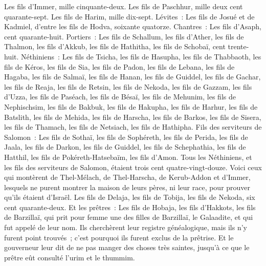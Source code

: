 \begin{multicols}{2}
Les fils d'Immer, mille cinquante-deux.
Les fils de Paschhur, mille deux cent quarante-sept.
Les fils de Harim, mille dix-sept.
Lévites~: Les fils de Josué et de Kadmiel, d'entre les fils de Hodva, soixante quatorze.
Chantres~: Les fils d'Asaph, cent quarante-huit.
Portiers~: Les fils de Schallum, les fils d'Ather, les fils de Thalmon, les fils d'Akkub, les fils de Hathitha, les fils de Schobaï, cent trente-huit.
Néthiniens~: Les fils de Tsicha, les fils de Hasupha, les fils de Thabbaoth,
les fils de Kéros, les fils de Sia, les fils de Padon,
les fils de Lebana, les fils de Hagaba, les fils de Salmaï,
les fils de Hanan, les fils de Guiddel, les fils de Gachar,
les fils de Reaja, les fils de Retsin, les fils de Nekoda,
les fils de Gazzam, les fils d'Uzza, les fils de Paséach,
les fils de Bésaï, les fils de Mehunim, les fils de Nephischsim,
les fils de Bakbuk, les fils de Hakupha, les fils de Harhur,
les fils de Batslith, les fils de Mehida, les fils de Harscha,
les fils de Barkos, les fils de Sisera, les fils de Thamach,
les fils de Netsiach, les fils de Hathipha.
Fils des serviteurs de Salomon~: Les fils de Sothaï, les fils de Sophéreth, les fils de Perida,
les fils de Jaala, les fils de Darkon, les fils de Guiddel,
les fils de Schephathia, les fils de Hatthil, les fils de Pokéreth-Hatsebaïm, les fils d'Amon.
Tous les Néthiniens, et les fils des serviteurs de Salomon, étaient trois cent quatre-vingt-douze.
Voici ceux qui montèrent de Thel-Mélach, de Thel-Harscha, de Kerub-Addon et d'Immer, lesquels ne purent montrer la maison de leurs pères, ni leur race, pour prouver qu'ils étaient d'Israël.
Les fils de Delaja, les fils de Tobija, les fils de Nekoda, six cent quarante-deux.
Et les prêtres~: Les fils de Hobaja, les fils d'Hakkots, les fils de Barzillaï, qui prit pour femme une des filles de Barzillaï, le Galaadite, et qui fut appelé de leur nom.
Ils cherchèrent leur registre généalogique, mais ils n'y furent point trouvés~; c'est pourquoi ils furent exclus de la prêtrise.
Et le gouverneur leur dit de ne pas manger des choses très saintes, jusqu'à ce que le prêtre eût consulté l'urim et le thummim.

\end{multicols}
